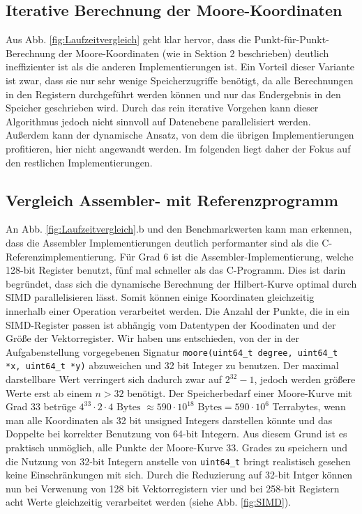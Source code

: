 \documentclass[course=erap]{aspdoc}
\begin{document}
 \FloatBarrier
 \subsection{Iterative Berechnung der Moore-Koordinaten}
Aus Abb. \ref{fig:Laufzeitvergleich} geht klar hervor, dass die Punkt-für-Punkt-Berechnung der Moore-Koordinaten (wie in Sektion 2 beschrieben) deutlich ineffizienter ist als die anderen Implementierungen ist. Ein Vorteil dieser Variante ist zwar, dass sie nur sehr wenige Speicherzugriffe benötigt, da alle Berechnungen in den Registern durchgeführt werden können und nur das Endergebnis in den Speicher geschrieben wird. Durch das rein iterative Vorgehen kann dieser Algorithmus jedoch nicht sinnvoll auf Datenebene parallelisiert werden. Außerdem kann der dynamische Ansatz, von dem die übrigen Implementierungen profitieren, hier nicht angewandt werden. Im folgenden liegt daher der Fokus auf den restlichen Implementierungen.

\subsection{Vergleich Assembler- mit Referenzprogramm}
An Abb. \ref{fig:Laufzeitvergleich}.b und den Benchmarkwerten kann man erkennen, dass die Assembler Implementierungen deutlich performanter sind als die C-Referenzimplementierung. 
Für Grad 6 ist die Assembler-Implementierung, welche 128-bit Register benutzt, fünf mal schneller als das C-Programm. Dies ist darin begründet, dass sich die dynamische Berechnung der Hilbert-Kurve optimal durch SIMD parallelisieren lässt.
Somit können einige Koordinaten gleichzeitig innerhalb einer Operation verarbeitet werden. Die Anzahl der Punkte, die in ein SIMD-Register passen ist abhängig vom Datentypen der Koodinaten und der Größe der Vektorregister.
Wir haben uns entschieden, von der in der Aufgabenstellung vorgegebenen Signatur \texttt{moore(uint64\_t degree, uint64\_t *x, uint64\_t *y)} abzuweichen und 32 bit Integer zu benutzen. Der maximal darstellbare Wert verringert sich dadurch zwar auf $2^{32}-1$, jedoch werden größere Werte erst ab einem $n > 32$ benötigt. Der Speicherbedarf einer Moore-Kurve mit Grad 33 betrüge $4^{33} \cdot 2 \cdot 4 \text{ Bytes } \approx 590 \cdot 10^{18} \text{ Bytes} = 590 \cdot 10^6$ Terrabytes, wenn man alle Koordinaten als 32 bit unsigned Integers darstellen könnte und das Doppelte bei korrekter Benutzung von 64-bit Integern. Aus diesem Grund ist es praktisch unmöglich, alle Punkte der Moore-Kurve 33. Grades zu speichern und die Nutzung von 32-bit Integern anstelle von \texttt{uint64\_t} bringt realistisch gesehen keine Einschränkungen mit sich. \newline
Durch die Reduzierung auf 32-bit Intger können nun bei Verwenung von 128 bit Vektorregistern vier und bei 258-bit Registern acht Werte gleichzeitig verarbeitet werden (siehe Abb. \ref{fig:SIMD}).
\end{document}
